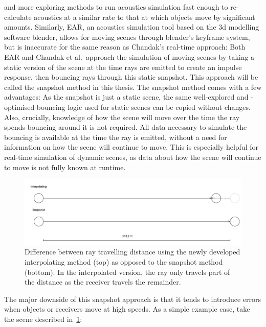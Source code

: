 and more exploring methods to run acoustics simulation fast enough
to re-calculate acoustics at a similar rate to that at which objects move by significant amounts.
\newline
Similarly, EAR, an acoustics simulation tool based on the 3d modelling software blender,
allows for moving scenes through blender's keyframe system,
but is inaccurate for the same reason as Chandak's real-time approach:
\newline
Both EAR and Chandak et al.\ approach the simulation of moving scenes by taking a static version of the scene
at the time rays are emitted to create an impulse response,
then bouncing rays through this static snapshot.
This approach will be called the snapshot method in this thesis.
\newline
The snapshot method comes with a few advantages:
As the snapshot is just a static scene,
the same well-explored and -optimised bouncing logic used for static scenes can be copied without changes.
Also, crucially, knowledge of how the scene will move over the time the ray spends bouncing around it is not required.
All data necessary to simulate the bouncing is available at the time the ray is emitted,
without a need for information on how the scene will continue to move.
This is especially helpful for real-time simulation of dynamic scenes, as data about how the scene will continue to move is not
fully known at runtime.
\newline
\begin{figure}\label{SnapshotExplain}
    \includegraphics[width=\linewidth]{images/snapshot_explain.jpg}
    \caption{Difference between ray travelling distance using the newly developed interpolating method (top) as opposed to the snapshot method (bottom). In the interpolated version, the ray only travels part of the distance as the receiver travels the remainder.}
\end{figure}
The major downside of this snapshot approach is that it tends to introduce errors when objects or receivers move at high speeds.
As a simple example case, take the scene described in~\ref{SnapshotExplain}:
